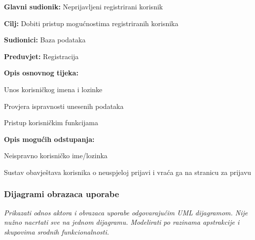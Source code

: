 					\noindent {}
					\begin{packed_item}
	
						\item \textbf{Glavni sudionik:} Neprijavljeni registrirani korisnik
						\item  \textbf{Cilj:} Dobiti pristup mogućnostima registriranih korisnika
						\item  \textbf{Sudionici:} Baza podataka
						\item  \textbf{Preduvjet:} Registracija
						\item  \textbf{Opis osnovnog tijeka:}
						
						\item[] \begin{packed_enum}
	
							\item Unos korisničkog imena i lozinke
							\item Provjera ispravnosti unesenih podataka
							\item Pristup korisničkim funkcijama
						\end{packed_enum}
						
						\item  \textbf{Opis mogućih odstupanja:}
						
						\item[] \begin{packed_item}
	
							\item[2.a] Neispravno korisničko ime/lozinka
							\item[] \begin{packed_enum}
								
								\item Sustav obavještava korisnika o neuspjeloj prijavi i vraća ga na stranicu za prijavu
								
							\end{packed_enum}
							
						\end{packed_item}
					\end{packed_item}
				
					
				\subsubsection{Dijagrami obrazaca uporabe}
					
					\textit{Prikazati odnos aktora i obrazaca uporabe odgovarajućim UML dijagramom. Nije nužno nacrtati sve na jednom dijagramu. Modelirati po razinama apstrakcije i skupovima srodnih funkcionalnosti.}
				\eject		
				

